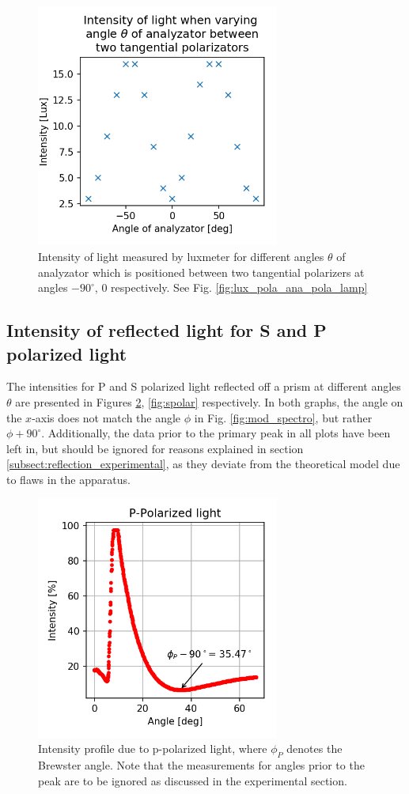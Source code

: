 \documentclass[11pt,a4paper, twocolumn]{article}
\begin{document}
  \begin{figure}[H]
    \center
    \includegraphics[width=8cm]{scripts/malus2.png}
    \caption{Intensity of light measured by luxmeter for different angles $\theta$ of analyzator which is positioned between two tangential polarizers at angles $-90^\circ$, $0$ respectively. See Fig. \ref{fig:lux_pola_ana_pola_lamp}}
    \label{fig:malus2}
  \end{figure}


  \subsection{Intensity of reflected light for S and P polarized light \label{sect:res_prism}}

  The intensities for P and S polarized light reflected off a prism at different angles $\theta$ are presented in Figures \ref{fig:ppolar}, \ref{fig:spolar} respectively. In both graphs, the angle on the $x$-axis does not match the angle $\phi$ in Fig. \ref{fig:mod_spectro}, but rather $\phi + 90^\circ$. Additionally, the data prior to the primary peak in all plots have been left in, but should be ignored for reasons explained in section \ref{subsect:reflection_experimental}, as they deviate from the theoretical model due to flaws in the apparatus.

  \begin{figure}[H]
    \center
    \includegraphics[width=8cm]{scripts/ppolar.png}
    \caption{Intensity profile due to p-polarized light, where $\phi_P$ denotes the Brewster angle. Note that the measurements for angles prior to the peak are to be ignored as discussed in the experimental section.}
    \label{fig:ppolar}
  \end{figure}
\end{document}

